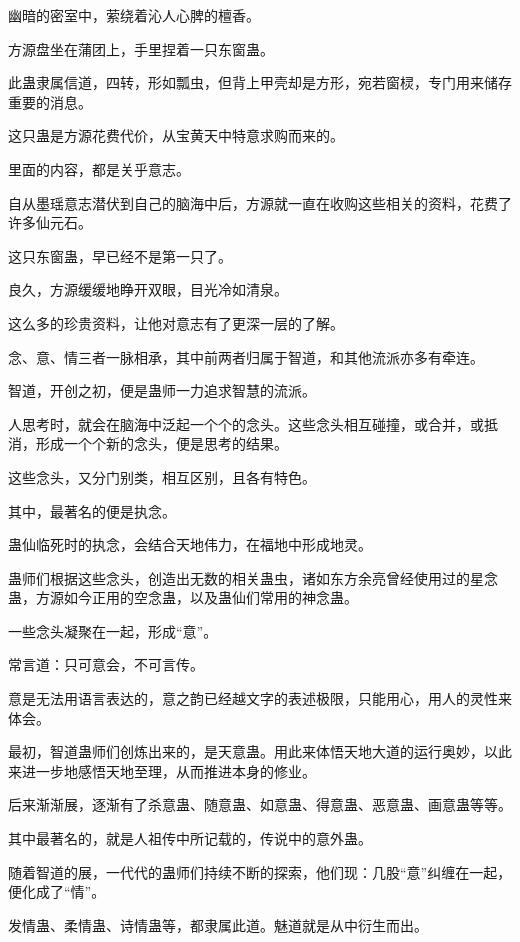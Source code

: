 
\begin{this_body}

幽暗的密室中，萦绕着沁人心脾的檀香。

方源盘坐在蒲团上，手里捏着一只东窗蛊。

此蛊隶属信道，四转，形如瓢虫，但背上甲壳却是方形，宛若窗棂，专门用来储存重要的消息。

这只蛊是方源花费代价，从宝黄天中特意求购而来的。

里面的内容，都是关乎意志。

自从墨瑶意志潜伏到自己的脑海中后，方源就一直在收购这些相关的资料，花费了许多仙元石。

这只东窗蛊，早已经不是第一只了。

良久，方源缓缓地睁开双眼，目光冷如清泉。

这么多的珍贵资料，让他对意志有了更深一层的了解。

念、意、情三者一脉相承，其中前两者归属于智道，和其他流派亦多有牵连。

智道，开创之初，便是蛊师一力追求智慧的流派。

人思考时，就会在脑海中泛起一个个的念头。这些念头相互碰撞，或合并，或抵消，形成一个个新的念头，便是思考的结果。

这些念头，又分门别类，相互区别，且各有特色。

其中，最著名的便是执念。

蛊仙临死时的执念，会结合天地伟力，在福地中形成地灵。

蛊师们根据这些念头，创造出无数的相关蛊虫，诸如东方余亮曾经使用过的星念蛊，方源如今正用的空念蛊，以及蛊仙们常用的神念蛊。

一些念头凝聚在一起，形成“意”。

常言道：只可意会，不可言传。

意是无法用语言表达的，意之韵已经越文字的表述极限，只能用心，用人的灵性来体会。

最初，智道蛊师们创炼出来的，是天意蛊。用此来体悟天地大道的运行奥妙，以此来进一步地感悟天地至理，从而推进本身的修业。

后来渐渐展，逐渐有了杀意蛊、随意蛊、如意蛊、得意蛊、恶意蛊、画意蛊等等。

其中最著名的，就是人祖传中所记载的，传说中的意外蛊。

随着智道的展，一代代的蛊师们持续不断的探索，他们现：几股“意”纠缠在一起，便化成了“情”。

发情蛊、柔情蛊、诗情蛊等，都隶属此道。魅道就是从中衍生而出。


\end{this_body}
